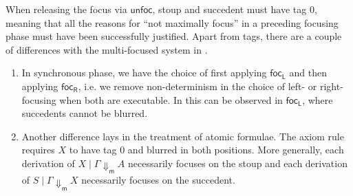 \documentclass[runningheads]{llncs}
\newcommand{\tr}{\otimes \mathsf{R}}
\newcommand{\lleft}{{\multimap}\mathsf{L}}
\newcommand{\pass}{\mathsf{pass}}
\newcommand{\unitl}{\mathsf{IL}}
\newcommand{\unitr}{\mathsf{IR}}
\newcommand{\otR}{\tr}
\newcommand{\lolliL}{\lleft}
\newcommand{\IL}{\unitl}
\newcommand{\IR}{\unitr}
\newcommand{\ax}{\mathsf{ax}}
\newcommand{\red}[1]{{#1^1}}
\newcommand{\up}{\Uparrow}
\newcommand{\dn}{\Downarrow}
\newcommand{\dnm}{\Downarrow_{\mathsf{m}}}
\newcommand{\focL}{\mathsf{foc_L}}
\newcommand{\focR}{\mathsf{foc_R}}
\newcommand{\blurL}{\mathsf{blur_L}}
\newcommand{\unfoc}{\mathsf{unfoc}}
\begin{document}

When releasing the focus via $\unfoc$, stoup and succedent must have tag 0, meaning that all the reasons for ``not maximally focus'' in a preceding focusing phase must have been successfully justified. Apart from tags, there are a couple of differences with the multi-focused system in .
\begin{enumerate}
  \item In synchronous phase, we have the choice of first applying $\focL$ and then applying $\focR$, i.e. we remove non-determinism in the choice of left- or right-focusing when both are executable. In  this can be observed in $\focL$, where succedents cannot be blurred. %
\item Another difference lays in the treatment of atomic formulae. The axiom rule requires $X$ to have tag 0 and blurred in both positions. More generally, %
each derivation of $X \mid \Gamma \dnm A$ necessarily focuses on the stoup and each derivation of $S \mid \Gamma \dnm X$ necessarily focuses on the succedent.
\end{enumerate}
\end{document}
